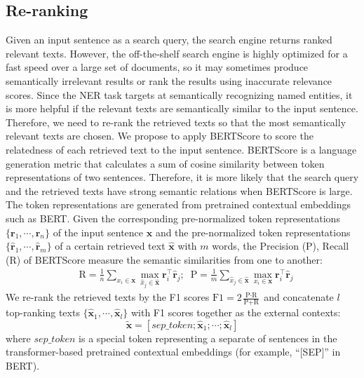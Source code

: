 \documentclass[11pt,a4paper]{article}
\def\vx{{\bm{x}}}
\newcommand{\rvec}{\mathbf{r}}
\begin{document}
\subsection{Re-ranking}
Given an input sentence as a search query, the search engine returns ranked relevant texts. However, the off-the-shelf search engine is highly optimized for a fast speed over a large set of documents, so it may sometimes produce semantically irrelevant results or rank the results using inaccurate relevance scores.
Since the NER task targets at semantically recognizing named entities, it is more helpful if the relevant texts are semantically similar to the input sentence. Therefore, we need to re-rank the retrieved texts so that the most semantically relevant texts are chosen. We propose to apply BERTScore \citep{Zhang*2020BERTScore:} to score the relatedness of each retrieved text to the input sentence. BERTScore is a language generation metric that calculates a sum of cosine similarity between token representations of two sentences. Therefore, it is more likely that the search query and the retrieved texts have strong semantic relations when BERTScore is large. The token representations are generated from pretrained contextual embeddings such as BERT. Given the corresponding pre-normalized token representations $\{\rvec_1, \cdots, \rvec_n\}$ of the input sentence $\vx$ and the pre-normalized token representations $\{\hat{\rvec}_1, \cdots, \hat{\rvec}_m\}$ of a certain retrieved text $\hat{\vx}$ with $m$ words, the Precision (P), Recall (R) of BERTScore measure the semantic similarities from one to another:
\begin{align*} &\text{R} =\frac{1}{n} \sum_{x_i \in \vx}   \max_{\hat{x}_j \in \hat{\vx}} \rvec_i^\top \hat{\rvec}_{j};\;\;
    \text{P} = \frac{1}{m}  \sum_{\hat{x}_j\in \hat{\vx}}   \max_{x_i\in \vx}  \rvec_{i}^\top \hat{\rvec}_{j}
\end{align*}
 We re-rank the retrieved texts by the F1 scores $\text{F1}{=} 2\frac{\text{P} \cdot \text{R} }{\text{P} + \text{R} }$ and concatenate $l$ top-ranking texts $\{\hat{\vx}_1, \cdots, \hat{\vx}_l\}$ with F1 scores together as the external contexts:
\begin{displaymath}
\tilde{\vx} = [sep\_token; \hat{\vx}_1; \cdots; \hat{\vx}_l]
\end{displaymath} 
where $sep\_token$ is a special token representing a separate of sentences in the transformer-based pretrained contextual embeddings (for example, ``[SEP]'' in BERT).
\end{document}
